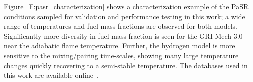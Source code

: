 \documentclass[11pt]{scrartcl}
\begin{document}
Figure~\ref{F:pasr_characterization} shows a characterization example of the PaSR conditions sampled for validation and performance testing in this work; a wide range of temperatures and fuel-mass fractions are observed for both models.
Significantly more diversity in fuel mass-fraction is seen for the GRI-Mech 3.0 near the adiabatic flame temperature.
Further, the hydrogen model is more sensitive to the mixing\slash pairing time-scales, showing many large temperature changes quickly recovering to a semi-stable temperature.
The databases used in this work are available online~\cite{Curtis2016:h2,Curtis2016:ch4}.


\printbibliography[title={References}]
\end{document}

